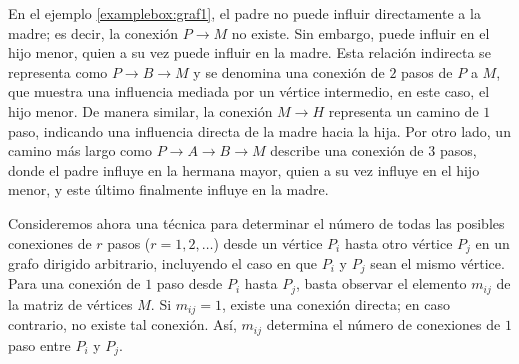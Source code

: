 
En el ejemplo \ref{examplebox:graf1}, el padre no puede influir directamente a la madre; es decir, la conexión $P \to M$ no existe. Sin embargo, puede influir en el hijo menor, quien a su vez puede influir en la madre. Esta relación indirecta se representa como $P \to B \to M$ y se denomina una conexión de $2$ pasos de $P$ a $M$, que muestra una influencia mediada por un vértice intermedio, en este caso, el hijo menor. De manera similar, la conexión $M \to H$ representa un camino de $1$ paso, indicando una influencia directa de la madre hacia la hija. Por otro lado, un camino más largo como $P \to A \to B \to M$ describe una conexión de $3$ pasos, donde el padre influye en la hermana mayor, quien a su vez influye en el hijo menor, y este último finalmente influye en la madre.

Consideremos ahora una técnica para determinar el número de todas las posibles conexiones de $r$ pasos ($r = 1, 2, \dots$) desde un vértice $P_i$ hasta otro vértice $P_j$ en un grafo dirigido arbitrario, incluyendo el caso en que $P_i$ y $P_j$ sean el mismo vértice. Para una conexión de $1$ paso desde $P_i$ hasta $P_j$, basta observar el elemento $m_{ij}$ de la matriz de vértices $M$. Si $m_{ij} = 1$, existe una conexión directa; en caso contrario, no existe tal conexión. Así, $m_{ij}$ determina el número de conexiones de $1$ paso entre $P_i$ y $P_j$.


